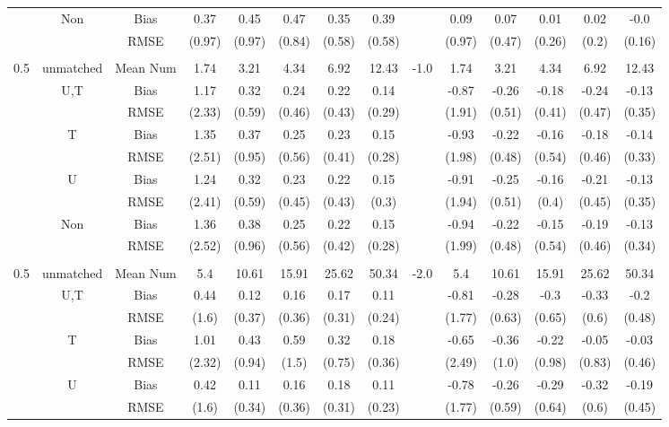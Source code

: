 \begin{tabular}{@{\extracolsep{5pt}}lc|cccccc|lccccc}
 & Non & Bias & 0.37 & 0.45 & 0.47 & 0.35 & 0.39 &  & 0.09 & 0.07 & 0.01 & 0.02 & -0.0 \\
 &  & RMSE & (0.97) & (0.97) & (0.84) & (0.58) & (0.58) &  & (0.97) & (0.47) & (0.26) & (0.2) & (0.16) \\
 &  &  &  &  &  &  &  &  &  &  &  &  &  \\
0.5 & unmatched & Mean Num & 1.74 & 3.21 & 4.34 & 6.92 & 12.43 & -1.0 & 1.74 & 3.21 & 4.34 & 6.92 & 12.43 \\
 & U,T & Bias & 1.17 & 0.32 & 0.24 & 0.22 & 0.14 &  & -0.87 & -0.26 & -0.18 & -0.24 & -0.13 \\
 &  & RMSE & (2.33) & (0.59) & (0.46) & (0.43) & (0.29) &  & (1.91) & (0.51) & (0.41) & (0.47) & (0.35) \\
 & T & Bias & 1.35 & 0.37 & 0.25 & 0.23 & 0.15 &  & -0.93 & -0.22 & -0.16 & -0.18 & -0.14 \\
 &  & RMSE & (2.51) & (0.95) & (0.56) & (0.41) & (0.28) &  & (1.98) & (0.48) & (0.54) & (0.46) & (0.33) \\
 & U & Bias & 1.24 & 0.32 & 0.23 & 0.22 & 0.15 &  & -0.91 & -0.25 & -0.16 & -0.21 & -0.13 \\
 &  & RMSE & (2.41) & (0.59) & (0.45) & (0.43) & (0.3) &  & (1.94) & (0.51) & (0.4) & (0.45) & (0.35) \\
 & Non & Bias & 1.36 & 0.38 & 0.25 & 0.22 & 0.15 &  & -0.94 & -0.22 & -0.15 & -0.19 & -0.13 \\
 &  & RMSE & (2.52) & (0.96) & (0.56) & (0.42) & (0.28) &  & (1.99) & (0.48) & (0.54) & (0.46) & (0.34) \\
 &  &  &  &  &  &  &  &  &  &  &  &  &  \\
0.5 & unmatched & Mean Num & 5.4 & 10.61 & 15.91 & 25.62 & 50.34 & -2.0 & 5.4 & 10.61 & 15.91 & 25.62 & 50.34 \\
 & U,T & Bias & 0.44 & 0.12 & 0.16 & 0.17 & 0.11 &  & -0.81 & -0.28 & -0.3 & -0.33 & -0.2 \\
 &  & RMSE & (1.6) & (0.37) & (0.36) & (0.31) & (0.24) &  & (1.77) & (0.63) & (0.65) & (0.6) & (0.48) \\
 & T & Bias & 1.01 & 0.43 & 0.59 & 0.32 & 0.18 &  & -0.65 & -0.36 & -0.22 & -0.05 & -0.03 \\
 &  & RMSE & (2.32) & (0.94) & (1.5) & (0.75) & (0.36) &  & (2.49) & (1.0) & (0.98) & (0.83) & (0.46) \\
 & U & Bias & 0.42 & 0.11 & 0.16 & 0.18 & 0.11 &  & -0.78 & -0.26 & -0.29 & -0.32 & -0.19 \\
 &  & RMSE & (1.6) & (0.34) & (0.36) & (0.31) & (0.23) &  & (1.77) & (0.59) & (0.64) & (0.6) & (0.45) \\

\end{tabular}
